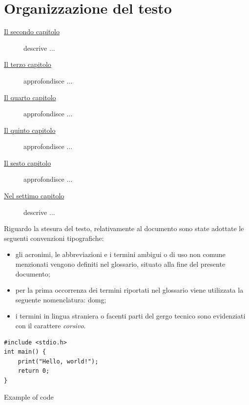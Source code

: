 \section{Organizzazione del testo}
\begin{description}
    \item[{\hyperref[chap:stage_desc]{Il secondo capitolo}}] descrive ...
    
    \item[{\hyperref[chap:descrizione-stage]{Il terzo capitolo}}] approfondisce ...
    
    \item[{\hyperref[chap:analisi-requisiti]{Il quarto capitolo}}] approfondisce ...
    
    \item[{\hyperref[chap:progettazione-codifica]{Il quinto capitolo}}] approfondisce ...
    
    \item[{\hyperref[chap:verifica-validazione]{Il sesto capitolo}}] approfondisce ...
    
    \item[{\hyperref[chap:conclusioni]{Nel settimo capitolo}}] descrive ...
\end{description}

Riguardo la stesura del testo, relativamente al documento sono state adottate le seguenti convenzioni tipografiche:
\begin{itemize}
	\item gli acronimi, le abbreviazioni e i termini ambigui o di uso non comune menzionati vengono definiti nel glossario, situato alla fine del presente documento;
	\item per la prima occorrenza dei termini riportati nel glossario viene utilizzata la seguente nomenclatura: \gls{domg};
	\item i termini in lingua straniera o facenti parti del gergo tecnico sono evidenziati con il carattere \textit{corsivo}.
\end{itemize}

\begin{listing}[H]
\begin{verbatim}
#include <stdio.h>
int main() {
    print("Hello, world!");
    return 0;
}
\end{verbatim}
\caption{Example of code}
\label{listing:a}
\end{listing}

\newpage